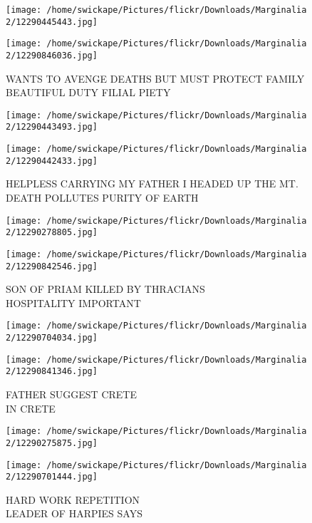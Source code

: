 \documentclass[10pt,letterpaper]{article}
\begin{document}
\texttt{[image: /home/swickape/Pictures/flickr/Downloads/Marginalia 2/12290445443.jpg]}

\vspace{0.25in}
\texttt{[image: /home/swickape/Pictures/flickr/Downloads/Marginalia 2/12290846036.jpg]}

WANTS TO AVENGE DEATHS BUT MUST PROTECT FAMILY\\
BEAUTIFUL DUTY FILIAL PIETY\\
\pagebreak

\texttt{[image: /home/swickape/Pictures/flickr/Downloads/Marginalia 2/12290443493.jpg]}

\vspace{0.25in}
\texttt{[image: /home/swickape/Pictures/flickr/Downloads/Marginalia 2/12290442433.jpg]}

HELPLESS CARRYING MY FATHER I HEADED UP THE MT.\\
DEATH POLLUTES PURITY OF EARTH\\
\pagebreak

\texttt{[image: /home/swickape/Pictures/flickr/Downloads/Marginalia 2/12290278805.jpg]}

\vspace{0.25in}
\texttt{[image: /home/swickape/Pictures/flickr/Downloads/Marginalia 2/12290842546.jpg]}

SON OF PRIAM KILLED BY THRACIANS\\
HOSPITALITY IMPORTANT\\
\pagebreak

\texttt{[image: /home/swickape/Pictures/flickr/Downloads/Marginalia 2/12290704034.jpg]}

\vspace{0.25in}
\texttt{[image: /home/swickape/Pictures/flickr/Downloads/Marginalia 2/12290841346.jpg]}

FATHER SUGGEST CRETE\\
IN CRETE\\
\pagebreak

\texttt{[image: /home/swickape/Pictures/flickr/Downloads/Marginalia 2/12290275875.jpg]}

\vspace{0.25in}
\texttt{[image: /home/swickape/Pictures/flickr/Downloads/Marginalia 2/12290701444.jpg]}

HARD WORK REPETITION\\
LEADER OF HARPIES SAYS\\
\pagebreak
\end{document}
